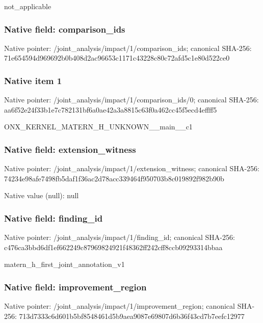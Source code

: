 \documentclass[10pt,a4paper]{article}
\begin{document}
\begingroup\raggedright\sloppy not\_\allowbreak{}applicable\par\endgroup

\subsubsection{Native field: comparison\_\allowbreak{}ids}
Native pointer: /joint\_\allowbreak{}analysis/impact/1/comparison\_\allowbreak{}ids; canonical SHA-256: 71e654594d969692b0b408d2ac96653c1171c43228c80c72afd5c1e80d522ce0

\subsubsection{Native item 1}
Native pointer: /joint\_\allowbreak{}analysis/impact/1/comparison\_\allowbreak{}ids/0; canonical SHA-256: aa6f52e24f33b1e7c782131bf6a0ae42a3a8815c63f0a462cc45f5ecd4effff5

\begingroup\raggedright\sloppy ONX\_\allowbreak{}KERNEL\_\allowbreak{}MATERN\_\allowbreak{}H\_\allowbreak{}UNKNOWN\_\allowbreak{}\_\allowbreak{}main\_\allowbreak{}\_\allowbreak{}c1\par\endgroup

\subsubsection{Native field: extension\_\allowbreak{}witness}
Native pointer: /joint\_\allowbreak{}analysis/impact/1/extension\_\allowbreak{}witness; canonical SHA-256: 74234e98afe7498fb5daf1f36ac2d78acc339464f950703b8c019892f982b90b

Native value (null): null

\subsubsection{Native field: finding\_\allowbreak{}id}
Native pointer: /joint\_\allowbreak{}analysis/impact/1/finding\_\allowbreak{}id; canonical SHA-256: c476ca3bbd6df1ef662249c87969824921f48362ff242cff8ccb09293314bbaa

\begingroup\raggedright\sloppy matern\_\allowbreak{}h\_\allowbreak{}first\_\allowbreak{}joint\_\allowbreak{}annotation\_\allowbreak{}v1\par\endgroup

\subsubsection{Native field: improvement\_\allowbreak{}region}
Native pointer: /joint\_\allowbreak{}analysis/impact/1/improvement\_\allowbreak{}region; canonical SHA-256: 713d7333c6d601b5bf8548461d5b9aea9087e69807d6b36f43cd7b7eefc12977
\end{document}
